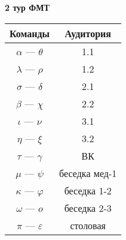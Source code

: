 \documentclass[12pt]{article}
\begin{document}
\begin{center}
{\Huge \bf 2 тур ФМТ\\}
\Huge
\vspace{3cm}
\begin{tabular}{| c | c |}
\hline
Команды & Аудитория\\ \hline
$\alpha$ --- $\theta$ & 1.1 \\ \hline
$\lambda$ --- $\rho$ & 1.2 \\ \hline
$\sigma$ --- $\delta$ & 2.1 \\ \hline
$\beta$ --- $\chi$ & 2.2 \\ \hline
$\iota$ --- $\nu$ & 3.1 \\ \hline
$\eta$ --- $\xi$ & 3.2 \\ \hline
$\tau$ --- $\gamma$ & ВК \\ \hline
$\mu$ --- $\psi$ & беседка мед-1\\ \hline
$\kappa$ --- $\varphi$ & беседка 1-2 \\ \hline
$\omega$ --- $o$ & беседка 2-3 \\ \hline
$\pi$ --- $\varepsilon$ & столовая \\ \hline
\end{tabular}
\end{center}
\end{document}
